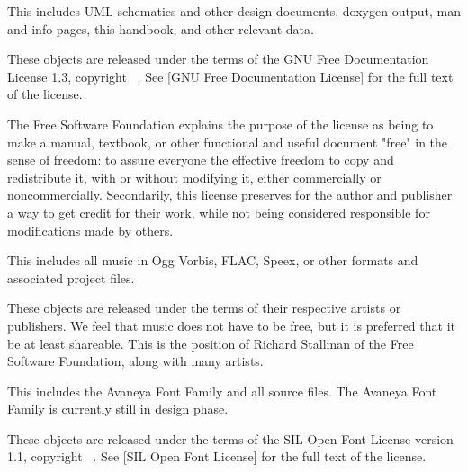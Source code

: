 
This includes UML schematics and other design documents, doxygen output, man and info pages, this handbook, and other relevant data.

These objects are released under the terms of the GNU Free Documentation License 1.3, copyright \CopyrightDates\ \CopyrightHolder. See [GNU Free Documentation License] for the full text of the license.

The Free Software Foundation explains the purpose of the license as being to make a manual, textbook, or other functional and useful document "free" in the sense of freedom: to assure everyone the effective freedom to copy and redistribute it, with or without modifying it, either commercially or noncommercially. Secondarily, this license preserves for the author and publisher a way to get credit for their work, while not being considered responsible for modifications made by others.


This includes all music in Ogg Vorbis, FLAC, Speex, or other formats and associated project files.

These objects are released under the terms of their respective artists or publishers. We feel that music does not have to be free, but it is preferred that it be at least shareable. This is the position of Richard Stallman of the Free Software Foundation, along with many artists.


This includes the Avaneya Font Family and all source files. The Avaneya Font Family is currently still in design phase.

These objects are released under the terms of the SIL Open Font License version 1.1, copyright \CopyrightDates\ \CopyrightHolder. See [SIL Open Font License] for the full text of the license.
\stopitemize

\StopChapter

